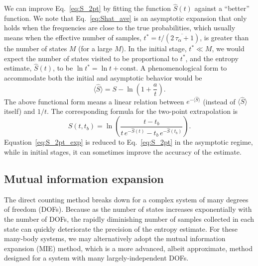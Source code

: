 \documentclass[reprint, superscriptaddress]{revtex4-1}
\begin{document}

We can improve Eq.~\eqref{eq:S_2pt} by
fitting the function $\hat S(t)$ against a ``better'' function.
%
We note that Eq.~\eqref{eq:Shat_ave} is an asymptotic expansion
that only holds when the frequencies are close to the true probabilities,
which usually means when the effective number of samples,
$t^* = t/(\overline{2 \, \tau_\alpha + 1})$, is greater than
the number of states $M$ (for a large $M$).
%
In the initial stage, $t^* \ll M$,
we would expect the number of states visited to be proportional to $t^*$,
and the entropy estimate, $\hat S(t)$,
to be $\ln t^* = \ln t + \mathrm{const.}$
%
A phenomenological form to accommodate both the initial and asymptotic behavior
would be
$$
  \bigl\langle \hat S \bigr\rangle
  = S - \ln\left(1 + \frac{a}{t}\right).
$$
The above functional form means a linear relation between
$e^{-\bigl\langle \hat S \bigr\rangle}$
(instead of $\bigl\langle \hat S \bigr\rangle$ itself)
and $1/t$.
%
The corresponding formula for the two-point extrapolation is
%
\begin{equation}
  \hat S(t, t_b) = \ln\left(
    \frac{ t - t_b }
         { t \, e^{-\hat S(t)} - t_b \, e^{-\hat S(t_b)} }
  \right)
  .
  \label{eq:S_2pt_exp}
\end{equation}
%
Equation~\eqref{eq:S_2pt_exp} is reduced to
Eq.~\eqref{eq:S_2pt} in the asymptotic regime,
while in initial stages, it can sometimes
improve the accuracy of the estimate.



\subsection{Mutual information expansion}


The direct counting method breaks down
for a complex system of many degrees of freedom (DOFs).
%
Because as the number of states increases exponentially with the number of DOFs,
the rapidly diminishing number of samples collected in each state
can quickly deteriorate the precision of the entropy estimate.
%
For these many-body systems,
we may alternatively adopt
the mutual information expansion (MIE) method,
which is a more advanced, albeit approximate, method designed for a system
with many largely-independent DOFs.
\end{document}
